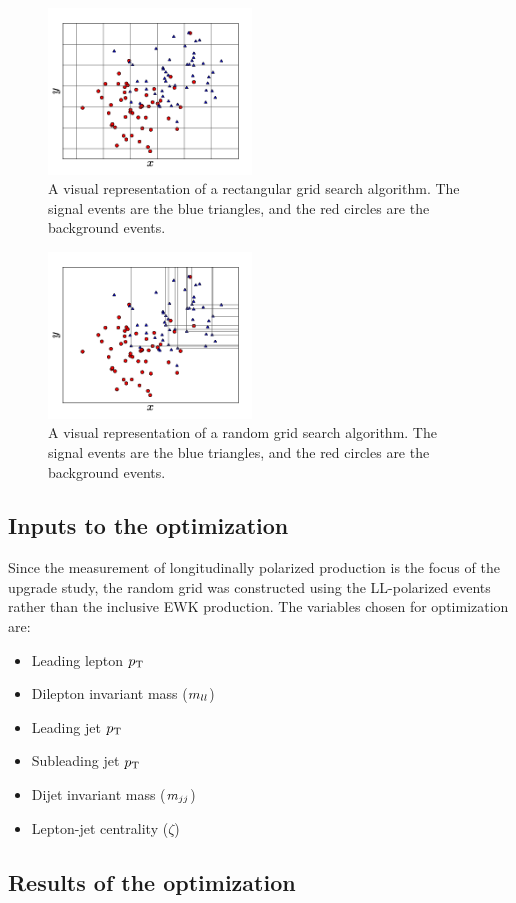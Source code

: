 \begin{figure}[htp]
  \centering
  \includegraphics[width=0.48\textwidth]{figs/ssww_upgrade/rgs/figures_cuts_regulargrid}
  \caption{A visual representation of a rectangular grid search algorithm.  The signal events are the blue triangles, and the red circles are the background events. }   
  \label{fig:rgs_square_grid}
\end{figure}

\begin{figure}[htp]
  \centering
  \includegraphics[width=0.48\textwidth]{figs/ssww_upgrade/rgs/figures_cuts_randomgrid}
  \caption{A visual representation of a random grid search algorithm.  The signal events are the blue triangles, and the red circles are the background events.  }   
  \label{fig:rgs_random_grid}
\end{figure}



\subsection{Inputs to the optimization}\label{sswwupgrade:opt_inputs}
Since the measurement of longitudinally polarized \ssww production is the focus of the upgrade study, the random grid was constructed using the LL-polarized events rather than the inclusive EWK production.
The variables chosen for optimization are:
\begin{itemize}
\item Leading lepton $p_{\mathrm{T}}$
\item Dilepton invariant mass ($m_{ll}$)
\item Leading jet $p_{\mathrm{T}}$
\item Subleading jet $p_{\mathrm{T}}$
\item Dijet invariant mass ($m_{jj}$)
\item Lepton-jet centrality ($\zeta$)
\end{itemize}

\subsection{Results of the optimization}\label{sswwupgrade:opt_results}
